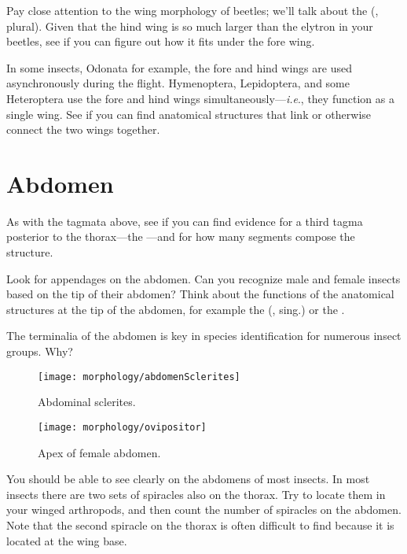 \noindent{}Pay close attention to the wing morphology of beetles; we'll talk about the  (, plural). Given that the hind wing is so much larger than the elytron in your beetles, see if you can figure out how it fits under the fore wing.\vspace{3mm}

\noindent{}In some insects, Odonata for example, the fore and hind wings are used asynchronously during the flight. Hymenoptera, Lepidoptera, and some Heteroptera use the fore and hind wings simultaneously---\textit{i.e}., they function as a single wing. See if you can find anatomical structures that link or otherwise connect the two wings together.\vspace{3mm}

\section{Abdomen}
As with the tagmata above, see if you can find evidence for a third tagma posterior to the thorax---the ---and for how many segments compose the structure.\vspace{3mm}

\noindent{}Look for appendages on the abdomen. Can you recognize male and female insects based on the tip of their abdomen? Think about the functions of the anatomical structures at the tip of the abdomen, for example the  (, sing.) or the .\vspace{3mm}

\begin{theo} 
{}The terminalia of the abdomen is key in species identification for numerous insect groups. Why?
\end{theo}

\begin{figure}[ht!]
  \centering
    \texttt{[image: morphology/abdomenSclerites]}
  \caption{Abdominal sclerites. \citep[][Figs. 2A--F]{snodgrass1937morphology}}
  \label{fig:abdominalsclerites}
\end{figure}

\begin{figure}[ht!]
  \centering
    \texttt{[image: morphology/ovipositor]}
  \caption{Apex of female abdomen. \citep[][Fig. 74A]{bhl128276}}
  \label{fig:ovipositor}
\end{figure}

\noindent{}You should be able to see  clearly on the abdomens of most insects. In most insects there are two sets of spiracles also on the thorax. Try to locate them in your winged arthropods, and then count the number of spiracles on the abdomen. Note that the second spiracle on the thorax is often difficult to find because it is located at the wing base.\vspace{3mm}

